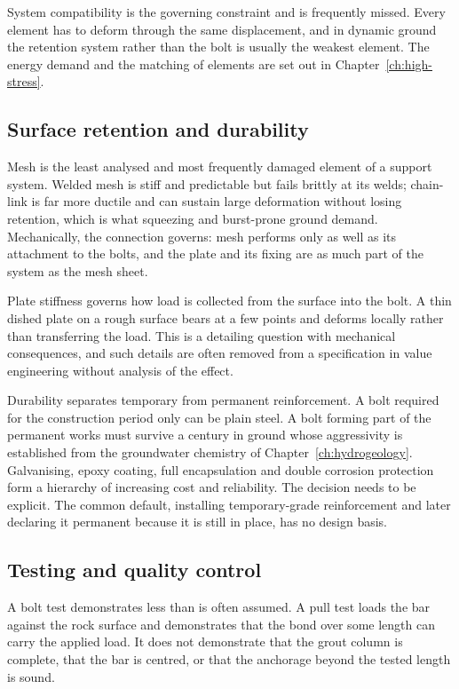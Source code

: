 System compatibility is the governing constraint and is frequently
missed. Every element has to deform through the same displacement, and in
dynamic ground the retention system rather than the bolt is usually the
weakest element.
The energy demand and the matching of elements are set out in
Chapter~\ref{ch:high-stress}.

\subsection{Surface retention and durability}
\label{sec:retention-durability}

Mesh is the least analysed and most frequently damaged element of a support
system. Welded mesh is stiff and predictable but fails brittly at its welds;
chain-link is far more ductile and can sustain large deformation without
losing retention, which is what squeezing and burst-prone ground demand. Mechanically, the connection governs: mesh performs only as well as its attachment
to the bolts, and the plate and its fixing are as much part of the system as
the mesh sheet.

Plate stiffness governs how load is collected from the surface into the bolt.
A thin dished plate on a rough surface bears at a few points and deforms
locally rather than transferring the load. This is a detailing question with
mechanical consequences, and such details are often removed from a
specification in value engineering without analysis of the effect.

Durability separates temporary from permanent reinforcement. A bolt required
for the construction period only can be plain steel. A bolt forming part of
the permanent works must survive a century in ground whose aggressivity is
established from the groundwater chemistry of
Chapter~\ref{ch:hydrogeology}. Galvanising, epoxy coating, full encapsulation
and double corrosion protection form a hierarchy of increasing cost and
reliability. The decision needs to be explicit. The common default, installing
temporary-grade reinforcement and later declaring it permanent because it is
still in place, has no design basis.

\subsection{Testing and quality control}
\label{sec:bolt-testing}

A bolt test demonstrates less than is often assumed. A pull test
loads the bar against the rock surface and demonstrates that the bond over
some length can carry the applied load. It does not demonstrate that the grout
column is complete, that the bar is centred, or that the anchorage beyond the
tested length is sound.

